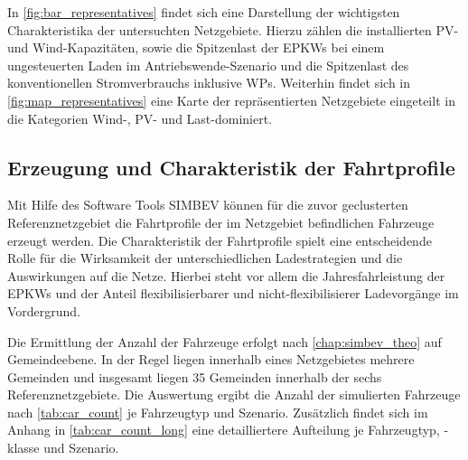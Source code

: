 

In \autoref{fig:bar_representatives} findet sich eine Darstellung der wichtigsten Charakteristika der untersuchten Netzgebiete.
Hierzu zählen die installierten \gls{PV}- und Wind-Kapazitäten, sowie die Spitzenlast der \glspl{EPKW} bei einem ungesteuerten Laden im Antriebswende-Szenario und die Spitzenlast des konventionellen Stromverbrauchs inklusive \glspl{WP}.
Weiterhin findet sich in \autoref{fig:map_representatives} eine Karte der repräsentierten Netzgebiete eingeteilt in die Kategorien Wind-, \gls{PV}- und Last-dominiert.






\subsection{Erzeugung und Charakteristik der Fahrtprofile}

Mit Hilfe des Software Tools \gls{SIMBEV} können für die zuvor geclusterten Referenznetzgebiet die Fahrtprofile der im Netzgebiet befindlichen Fahrzeuge erzeugt werden.
Die Charakteristik der Fahrtprofile spielt eine entscheidende Rolle für die Wirksamkeit der unterschiedlichen Ladestrategien und die Auswirkungen auf die Netze.
Hierbei steht vor allem die Jahresfahrleistung der \glspl{EPKW} und der Anteil flexibilisierbarer und nicht-flexibilisierer Ladevorgänge im Vordergrund.\medskip

Die Ermittlung der Anzahl der Fahrzeuge erfolgt nach \autoref{chap:simbev_theo} auf Gemeindeebene.
In der Regel liegen innerhalb eines Netzgebietes mehrere Gemeinden und insgesamt liegen \num{35} Gemeinden innerhalb der sechs Referenznetzgebiete.
Die Auswertung ergibt die Anzahl der simulierten Fahrzeuge nach \autoref{tab:car_count} je Fahrzeugtyp und Szenario.
Zusätzlich findet sich im Anhang in \autoref{tab:car_count_long} eine detailliertere Aufteilung je Fahrzeugtyp, -klasse und Szenario.



